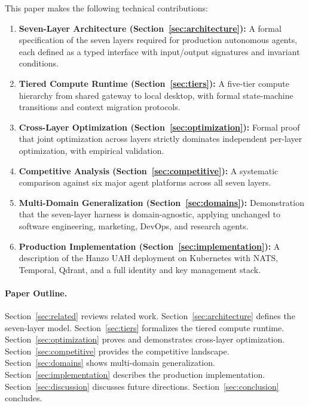 \documentclass[11pt]{article}
\begin{document}
This paper makes the following technical contributions:

\begin{enumerate}[leftmargin=1.5em]
    \item \textbf{Seven-Layer Architecture (Section~\ref{sec:architecture}):}
          A formal specification of the seven layers required for production
          autonomous agents, each defined as a typed interface with input/output
          signatures and invariant conditions.
    \item \textbf{Tiered Compute Runtime (Section~\ref{sec:tiers}):}
          A five-tier compute hierarchy from shared gateway to local desktop,
          with formal state-machine transitions and context migration protocols.
    \item \textbf{Cross-Layer Optimization (Section~\ref{sec:optimization}):}
          Formal proof that joint optimization across layers strictly dominates
          independent per-layer optimization, with empirical validation.
    \item \textbf{Competitive Analysis (Section~\ref{sec:competitive}):}
          A systematic comparison against six major agent platforms across all
          seven layers.
    \item \textbf{Multi-Domain Generalization (Section~\ref{sec:domains}):}
          Demonstration that the seven-layer harness is domain-agnostic,
          applying unchanged to software engineering, marketing, DevOps, and
          research agents.
    \item \textbf{Production Implementation (Section~\ref{sec:implementation}):}
          A description of the Hanzo UAH deployment on Kubernetes with NATS,
          Temporal, Qdrant, and a full identity and key management stack.
\end{enumerate}

\paragraph{Paper Outline.}
Section~\ref{sec:related} reviews related work. Section~\ref{sec:architecture}
defines the seven-layer model. Section~\ref{sec:tiers} formalizes the tiered
compute runtime. Section~\ref{sec:optimization} proves and demonstrates
cross-layer optimization. Section~\ref{sec:competitive} provides the competitive
landscape. Section~\ref{sec:domains} shows multi-domain generalization.
Section~\ref{sec:implementation} describes the production implementation.
Section~\ref{sec:discussion} discusses future directions.
Section~\ref{sec:conclusion} concludes.
\end{document}
